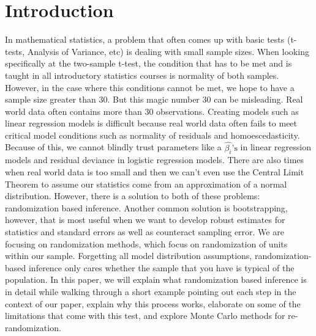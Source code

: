 \setcounter{page}{1} %

\section{Introduction} %

In mathematical statistics, a problem that often comes up with basic tests (t-tests, Analysis of Variance, etc) is dealing with small sample sizes. When looking specifically at the two-sample t-test, the condition that has to be met and is taught in all introductory statistics courses is normality of both samples. However, in the case where this conditions cannot be met, we hope to have a sample size greater than $30$. But this magic number $30$ can be misleading. Real world data often contains more than $30$ observations. Creating models such as linear regression models is difficult because real world data often fails to meet critical model conditions such as normality of residuals and homoescedasticity. Because of this, we cannot blindly trust parameters like a $\hat{\beta_i}\text{'s}$ in linear regression models and residual deviance in logistic regression models. There are also times when real world data is too small and then we can’t even use the Central Limit Theorem to assume our statistics come from an approximation of a normal distribution. However, there is a solution to both of these problems: randomization based inference. Another common solution is bootstrapping, however, that is most useful when we want to develop robust estimates for statistics and standard errors as well as counteract sampling error. We are focusing on randomization methods, which focus on randomization of units within our sample. Forgetting all model distribution assumptions, randomization-based inference only cares whether the sample that you have is typical of the population. In this paper, we will explain what randomization based inference is in detail while walking through a short example pointing out each step in the context of our paper, explain why this process works, elaborate on some of the limitations that come with this test, and explore Monte Carlo methods for re-randomization. 
